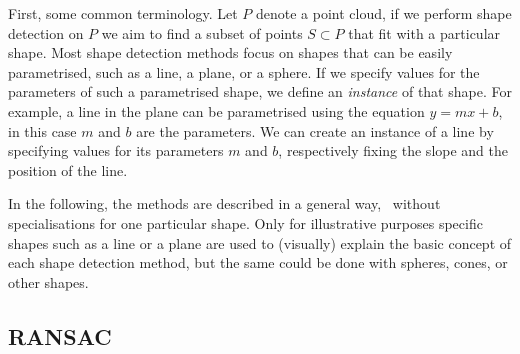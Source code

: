 First, some common terminology.
Let $P$ denote a point cloud, if we perform shape detection on $P$ we aim to find a subset of points $S \subset P$ that fit with a particular shape. 
Most shape detection methods focus on shapes that can be easily parametrised, such as a line, a plane, or a sphere. 
If we specify values for the parameters of such a parametrised shape, we define an \emph{instance} of that shape.
For example, a line in the plane can be parametrised using the equation $y = mx + b$, in this case $m$ and $b$ are the parameters.
We can create an instance of a line by specifying values for its parameters $m$ and $b$, respectively fixing the slope and the position of the line.

In the following, the methods are described in a general way, \ie\ without specialisations for one particular shape.
Only for illustrative purposes specific shapes such as a line or a plane are used to (visually) explain the basic concept of each shape detection method, but the same could be done with spheres, cones, or other shapes.




\subsection{RANSAC}%

